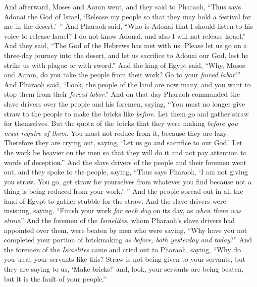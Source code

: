 \begin{biblechapter} %
 And afterward, Moses and Aaron went, and they said to Pharaoh, “Thus says Adonai the God of Israel, ‘Release my people so that they may hold a festival for me in the desert.’ ”
\verse And Pharaoh said, “Who is Adonai that I should listen to his voice to release Israel? I do not know Adonai, and also I will not release Israel.”
\verse And they said, “The God of the Hebrews has met with us. Please let us go on a three-day journey into the desert, and let us sacrifice to Adonai our God, lest he strike us with plague or with sword.”
\verse And the king of Egypt said, “Why, Moses and Aaron, do you take the people from their work? Go to your \textit{forced labor}!”
\verse And Pharaoh said, “Look, the people of the land are now many, and you want to stop them from their \textit{forced labor}.”
\verse And on that day Pharaoh commanded the slave drivers over the people and his foremen, saying,
\verse “You must no longer give straw to the people to make the bricks like \textit{before}. Let them go and gather straw for themselves.
\verse But the quota of the bricks that they were making \textit{before} \textit{you must require of them}. You must not reduce from it, because they are lazy. Therefore they are crying out, saying, ‘Let us go and sacrifice to our God.’
\verse Let the work be heavier on the men so that they will do it and not pay attention to words of deception.”
\verse And the slave drivers of the people and their foremen went out, and they spoke to the people, saying, “Thus says Pharaoh, ‘I am not giving you straw.
\verse You go, get straw for yourselves from whatever you find because not a thing is being reduced from your work.’ ”
\verse And the people spread out in all the land of Egypt to gather stubble for the straw.
\verse And the slave drivers were insisting, saying, “Finish your work \textit{for each day} on its day, as \textit{when there was straw}.”
\verse And the foremen of the \textit{Israelites}, whom Pharaoh’s slave drivers had appointed over them, were beaten by men who were saying, “Why have you not completed your portion of brickmaking \textit{as before, both yesterday and today}?”
 And the foremen of the \textit{Israelites} came and cried out to Pharaoh, saying, “Why do you treat your servants like this?
\verse Straw is not being given to your servants, but they are saying to us, ‘Make bricks!’ and, look, your servants are being beaten, but it is the fault of your people.”

\end{biblechapter}
